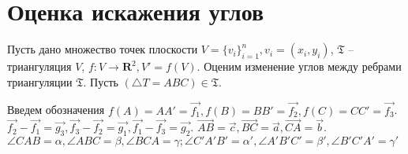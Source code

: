 \documentclass{article}
\begin{document}
\section*{Оценка искажения углов}
Пусть дано множество точек плоскости $V = \{v_i\}_{i=1}^n, v_i = (x_i, y_i)$, $\mathfrak{T}$ -- триангуляция $V$, $f: V \to \mathbf{R}^2, V' = f(V)$. Оценим изменение углов между 
ребрами триангуляции $\mathfrak{T}$. Пусть $(\triangle T = ABC) \in \mathfrak{T}$. 

Введем обозначения $f(A) = {AA'} = \vec{f_1}, f(B) = {BB'} = \vec{f_2}, f(C) = {CC'} = \vec{f_3}$. 
$\vec{f_2} - \vec{f_1} = \vec{g_3}, \vec{f_3} - \vec{f_2} = \vec{g_1}, \vec{f_1} - \vec{f_3} = \vec{g_2}$. $\vec{AB} = \vec{c}, \vec{BC} = \vec{a}, \vec{CA} = \vec{b}.$
$\angle{CAB} = \alpha, \angle{ABC} = \beta, \angle{BCA} = \gamma; \angle{C'A'B'} = \alpha', \angle{A'B'C'} = \beta', \angle{B'C'A'} = \gamma'$   

\end{document}
